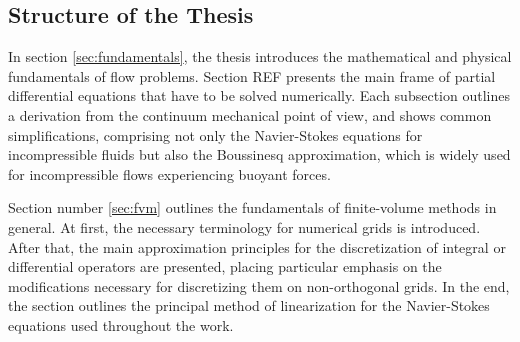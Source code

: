 \subsection{Structure of the Thesis}

In section \ref{sec:fundamentals}, the thesis introduces the mathematical and physical fundamentals of flow problems. Section REF presents the main frame of partial differential equations that have to be solved numerically. Each subsection outlines a derivation from the continuum mechanical point of view, and shows common simplifications, comprising not only the Navier-Stokes equations for incompressible fluids but also the Boussinesq approximation, which is widely used for incompressible flows experiencing buoyant forces.

Section number \ref{sec:fvm} outlines the fundamentals of finite-volume methods in general. At first, the necessary terminology for numerical grids is introduced. After that, the main approximation principles for the discretization of integral or differential operators are presented, placing particular emphasis on the modifications necessary for discretizing them on non-orthogonal grids. In the end, the section outlines the principal method of linearization for the Navier-Stokes equations used throughout the work.

